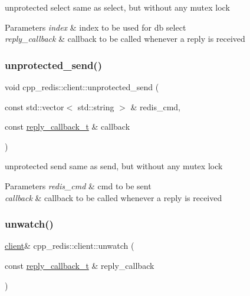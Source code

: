 unprotected select same as select, but without any mutex lock


\begin{DoxyParams}{Parameters}
{\em index} & index to be used for db select \\
\hline
{\em reply\+\_\+callback} & callback to be called whenever a reply is received \\
\hline
\end{DoxyParams}
\mbox{\label{classcpp__redis_1_1client_a89e9857149094a693abb2e4015779231}} 
\subsubsection{\texorpdfstring{unprotected\+\_\+send()}{unprotected\_send()}}
{\footnotesize\ttfamily void cpp\+\_\+redis\+::client\+::unprotected\+\_\+send (\begin{DoxyParamCaption}\item[{const std\+::vector$<$ std\+::string $>$ \&}]{redis\+\_\+cmd,  }\item[{const \hyperlink{classcpp__redis_1_1client_a061a1140d36d2eaeda82b09a0bb3f9f2}{reply\+\_\+callback\+\_\+t} \&}]{callback }\end{DoxyParamCaption})\hspace{0.3cm}{\ttfamily [private]}}

unprotected send same as send, but without any mutex lock


\begin{DoxyParams}{Parameters}
{\em redis\+\_\+cmd} & cmd to be sent \\
\hline
{\em callback} & callback to be called whenever a reply is received \\
\hline
\end{DoxyParams}
\mbox{\label{classcpp__redis_1_1client_aaf19c28495b74c8c22a8d86e80a1557e}} 
\subsubsection{\texorpdfstring{unwatch()}{unwatch()}\hspace{0.1cm}{\footnotesize\ttfamily [1/2]}}
{\footnotesize\ttfamily \hyperlink{classcpp__redis_1_1client}{client}\& cpp\+\_\+redis\+::client\+::unwatch (\begin{DoxyParamCaption}\item[{const \hyperlink{classcpp__redis_1_1client_a061a1140d36d2eaeda82b09a0bb3f9f2}{reply\+\_\+callback\+\_\+t} \&}]{reply\+\_\+callback }\end{DoxyParamCaption})}

